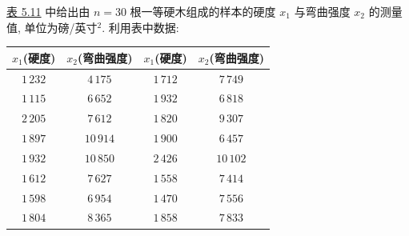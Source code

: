 \medskip
\noindent{}\quad \hyperref[tab:5.11]{表 5.11} 中给出由 $n=30$ 根一等硬木组成的样本的硬度 $x_{1}$ 与弯曲强度 $x_{2}$ 的测量值, 单位为磅/英寸$^{2}$. 利用表中数据:

\begin{mvtable}
\label{tab:5.11}
\centering
\begin{tabular}{|c|c||c|c|}
\hline
$x_{1}$(硬度) & $x_{2}$(弯曲强度) & $x_{1}$(硬度) & $x_{2}$(弯曲强度)\\
\hline
$1\,232$ & $4\,175$ & $1\,712$ & $7\,749$\\
$1\,115$ & $6\,652$ & $1\,932$ & $6\,818$\\
$2\,205$ & $7\,612$ & $1\,820$ & $9\,307$\\
$1\,897$ & $10\,914$ & $1\,900$ & $6\,457$\\
$1\,932$ & $10\,850$ & $2\,426$ & $10\,102$\\
$1\,612$ & $7\,627$ & $1\,558$ & $7\,414$\\
$1\,598$ & $6\,954$ & $1\,470$ & $7\,556$\\
$1\,804$ & $8\,365$ & $1\,858$ & $7\,833$\\
\hline
\end{tabular}
\end{mvtable}
